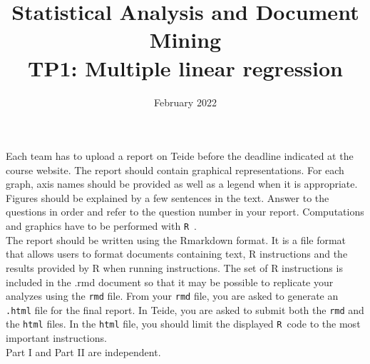 \documentclass[12pt,a4paper]{article}
\newcommand{\R}{\texttt{R}~}
\begin{document}
\title{\textbf{Statistical Analysis and Document Mining} \\[1em] TP1: Multiple linear regression}
\date{\vspace{-2em}February 2022}
\maketitle


Each team has to upload a report on Teide before the deadline indicated at the course website. The report should contain graphical representations. For each graph, axis names should be provided as well as a legend when it is appropriate. Figures should be explained by a few sentences in the text. Answer to the questions in order and refer to the question number in your report. Computations and graphics have to be performed with \R.\\

The report should be written using the Rmarkdown format. It is a file format that allows
users to format documents containing text, R instructions and the results provided by R when running instructions. The set of R instructions is included in the .rmd document so that it may be possible to replicate your analyzes using the \texttt{rmd} file. From your \texttt{rmd} file, you are asked to generate an \texttt{.html} file for the final report. In Teide, you are asked to submit both the \texttt{rmd} and the \texttt{html} files. In the \texttt{html} file, you should limit the displayed \R code to the most important instructions.\\

Part I and Part II are independent.

\newpage
\end{document}
